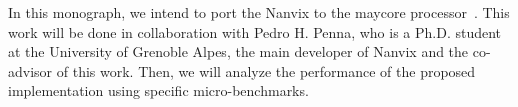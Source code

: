     In this monograph, we intend to port the Nanvix \hal to the \mppa maycore processor~\cite{DeDinechin2013-1}. This work will be done in collaboration with Pedro H. Penna, who is a Ph.D. student at the University of Grenoble Alpes, the main developer of Nanvix and the co-advisor of this work. Then, we will analyze the performance of the proposed implementation using specific micro-benchmarks.

%
%    
    
